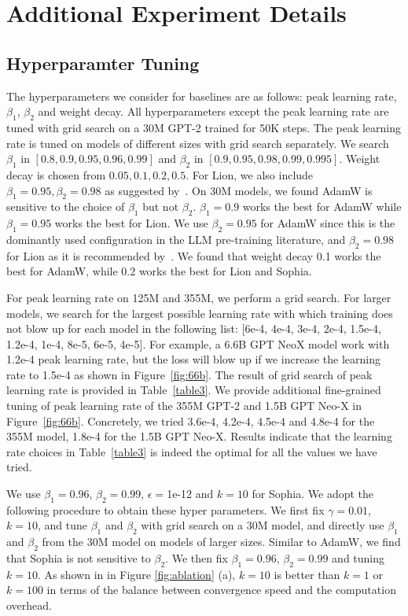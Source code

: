 \section{Additional Experiment Details}\label{sec:add_detail}
\subsection{Hyperparamter Tuning}\label{sec:hyper_param}
The hyperparameters we consider for baselines are as follows: peak learning rate, $\beta_1$, $\beta_2$ and weight decay. All hyperparameters except the peak learning rate are tuned with grid search on a 30M GPT-2 trained for 50K steps. The peak learning rate is tuned on models of different sizes with grid search separately. We search $\beta_1$ in $[0.8,0.9, 0.95, 0.96, 0.99]$ and $\beta_2$ in $[0.9,0.95,0.98,0.99,0.995]$. Weight decay is chosen from $0.05, 0.1,0.2,0.5$. For Lion, we also include $\beta_1 = 0.95, \beta_2=0.98$ as suggested by~\citet{chen2023symbolic}. On 30M models, we found AdamW is sensitive to the choice of $\beta_1$ but not $\beta_2$. $\beta_1=0.9$ works the best for AdamW while $\beta_1=0.95$ works the best for Lion. We use $\beta_2=0.95$ for AdamW since this is the dominantly used configuration in the LLM pre-training literature, and $\beta_2=0.98$ for Lion as it is recommended by~\citet{chen2023symbolic}. We found that weight decay 0.1 works the best for AdamW, while 0.2 works the best for Lion and Sophia. 

For peak learning rate on 125M and 355M, we perform a grid search. For larger models, we search for the largest possible learning rate with which training does not blow up for each model in the following list: [6e-4, 4e-4, 3e-4, 2e-4, 1.5e-4, 1.2e-4, 1e-4, 8e-5, 6e-5, 4e-5]. For example, a 6.6B GPT NeoX model work with 1.2e-4 peak learning rate, but the loss will blow up if we increase the learning rate to 1.5e-4 as shown in Figure~\ref{fig:66b}. The result of grid search of peak learning rate is provided in Table~\ref{table3}. We provide additional fine-grained tuning of peak learning rate of the 355M GPT-2 and 1.5B GPT Neo-X in Figure~\ref{fig:66b}. Concretely, we tried 3.6e-4, 4.2e-4, 4.5e-4 and 4.8e-4 for the 355M model, 1.8e-4 for the 1.5B GPT Neo-X. Results indicate that the learning rate choices in Table~\ref{table3} is indeed the optimal for all the values we have tried.

We use $\beta_1=0.96$, $\beta_2=0.99$, $\epsilon =$1e-12 and $k=10$ for Sophia. We adopt the following procedure to obtain these hyper parameters. We first fix $\gamma = 0.01$, $k=10$, and tune $\beta_1$ and $\beta_2$ with grid search on a 30M model, and directly use $\beta_1$ and $\beta_2$ from the 30M model on models of larger sizes. Similar to AdamW, we find that Sophia is not sensitive to $\beta_2$. We then fix $\beta_1=0.96$, $\beta_2=0.99$ and tuning $k=10$. As shown in in Figure \ref{fig:ablation} (a), $k=10$ is better than $k=1$ or $k=100$ in terms of the balance between convergence speed and the computation overhead.

